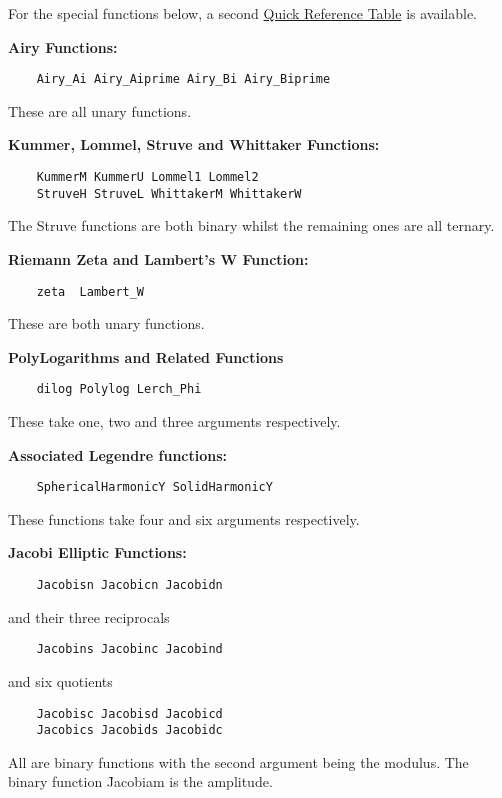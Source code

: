 For the special functions below, a second
\hyperlink{SPECFNTAB2}{Quick Reference Table} is available.

\textbf{Airy Functions:}
\begin{verbatim}
    Airy_Ai Airy_Aiprime Airy_Bi Airy_Biprime
\end{verbatim}
These are all unary functions.

\textbf{Kummer, Lommel, Struve and Whittaker Functions:}
\begin{verbatim}
    KummerM KummerU Lommel1 Lommel2
    StruveH StruveL WhittakerM WhittakerW
\end{verbatim}
The Struve functions are both binary whilst the remaining ones are all ternary.

 
\textbf{Riemann Zeta and Lambert's W Function:}
\begin{verbatim}
    zeta  Lambert_W
\end{verbatim}
These are both unary functions.

 
\textbf{PolyLogarithms and Related Functions}
\begin{verbatim}
    dilog Polylog Lerch_Phi
\end{verbatim}
These take one, two and three arguments respectively.

\textbf{Associated Legendre functions:}
\begin{verbatim}
    SphericalHarmonicY SolidHarmonicY
\end{verbatim}
These functions take four and six arguments respectively.

\textbf{Jacobi Elliptic Functions:}
\begin{verbatim}
    Jacobisn Jacobicn Jacobidn
\end{verbatim}
and their three reciprocals
\begin{verbatim}
    Jacobins Jacobinc Jacobind
\end{verbatim}
and six quotients
\begin{verbatim}
    Jacobisc Jacobisd Jacobicd
    Jacobics Jacobids Jacobidc
\end{verbatim}
All are binary functions with the second argument being the modulus.
The binary function \f{Jacobiam} is the amplitude.

